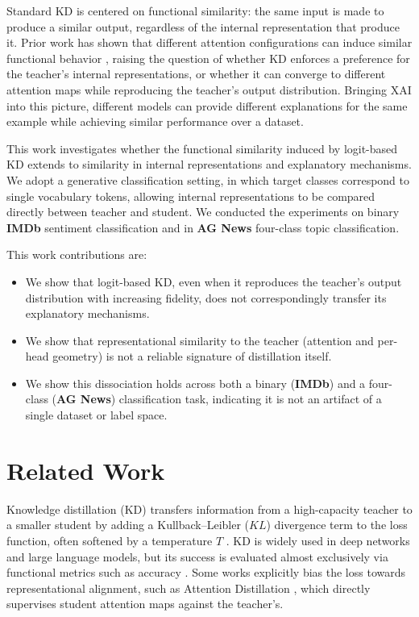 \documentclass[conference]{IEEEtran}
\begin{document}
Standard KD is centered on functional similarity: the same input is made to produce a similar output, regardless of the internal representation that produce it. Prior work has shown that different attention configurations can induce similar functional behavior \cite{jain2019attention}, raising the question of whether KD enforces a preference for the teacher's internal representations, or whether it can converge to different attention maps while reproducing the teacher's output distribution. Bringing XAI into this picture, different models can provide different explanations for the same example while achieving similar performance over a dataset.

This work investigates whether the functional similarity induced by logit-based KD extends to similarity in internal representations and explanatory mechanisms. We adopt a generative classification setting, in which target classes correspond to single vocabulary tokens, allowing internal representations to be compared directly between teacher and student. We conducted the experiments on binary \textbf{IMDb} sentiment classification and in \textbf{AG News} four-class topic classification.

This work contributions are:
\begin{itemize}
    \item We show that logit-based KD, even when it reproduces the teacher's output distribution with increasing fidelity, does not correspondingly transfer its explanatory mechanisms.
    \item We show that representational similarity to the teacher (attention and per-head geometry) is not a reliable signature of distillation itself.
    \item We show this dissociation holds across both a binary (\textbf{IMDb}) and a four-class (\textbf{AG News}) classification task, indicating it is not an artifact of a single dataset or label space.
\end{itemize}

\section{Related Work}

Knowledge distillation (KD) transfers information from a high-capacity teacher to a smaller student by adding a Kullback--Leibler ($KL$) divergence term to the loss function, often softened by a temperature $T$ \cite{hinton2015distilling}. KD is widely used in deep networks and large language models, but its success is evaluated almost exclusively via functional metrics such as accuracy \cite{gou2021knowledge}. Some works explicitly bias the loss towards representational alignment, such as Attention Distillation \cite{zhou2025attention}, which directly supervises student attention maps against the teacher's.
\end{document}
